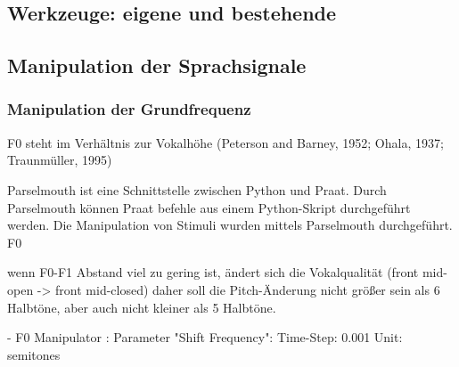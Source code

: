 \documentclass[11pt,a4paper,headsepline,twoside,toc=bibliography]{scrreprt}
\begin{document}
\subsection{Werkzeuge: eigene und bestehende}

\subsection{Manipulation der Sprachsignale}

\subsubsection{Manipulation der Grundfrequenz}
\label{sec:f0_manipulation}
F0 steht im Verhältnis zur Vokalhöhe (Peterson and Barney, 1952; Ohala, 1937; Traunmüller, 1995)

Parselmouth ist eine Schnittstelle zwischen Python und Praat. Durch Parselmouth können Praat befehle aus einem Python-Skript durchgeführt werden. Die Manipulation von Stimuli wurden mittels Parselmouth durchgeführt. 		
F0 

wenn F0-F1 Abstand viel zu gering ist, ändert sich die Vokalqualität (front mid-open -> front mid-closed)
daher soll die Pitch-Änderung nicht größer sein als 6 Halbtöne, aber auch nicht kleiner als 5 Halbtöne.

- F0 Manipulator : 
Parameter "Shift Frequency":
Time-Step: 0.001
Unit: semitones
\end{document}
